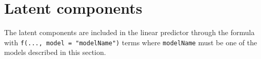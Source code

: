 \chapter{Latent components}
The latent components are included in the linear predictor through the 
formula with \texttt{f(..., model = "modelName")} terms where 
\texttt{modelName} must be one of the models described in this section.

\localtableofcontents

